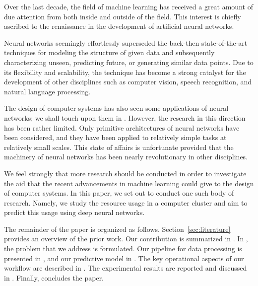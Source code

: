 Over the last decade, the field of machine learning has received a great amount
of due attention from both inside and outside of the field. This interest is
chiefly ascribed to the renaissance in the development of artificial neural
networks.

Neural networks seemingly effortlessly superseded the back-then state-of-the-art
techniques for modeling the structure of given data and subsequently
characterizing unseen, predicting future, or generating similar data points. Due
to its flexibility and scalability, the technique has become a strong catalyst
for the development of other disciplines such as computer vision, speech
recognition, and natural language processing.

The design of computer systems has also seen some applications of neural
networks; we shall touch upon them in . However, the research
in this direction has been rather limited. Only primitive architectures of
neural networks have been considered, and they have been applied to relatively
simple tasks at relatively small scales. This state of affairs is unfortunate
provided that the machinery of neural networks has been nearly revolutionary in
other disciplines.

We feel strongly that more research should be conducted in order to investigate
the aid that the recent advancements in machine learning could give to the
design of computer systems. In this paper, we set out to conduct one such body
of research. Namely, we study the resource usage in a computer cluster and aim
to predict this usage using deep neural networks.

The remainder of the paper is organized as follows. Section~\ref{sec:literature}
provides an overview of the prior work. Our contribution is summarized in
. In , the problem that we address is
formulated. Our pipeline for data processing is presented in , and
our predictive model in . The key operational aspects of our
workflow are described in . The experimental results are
reported and discussed in . Finally,  concludes
the paper.
